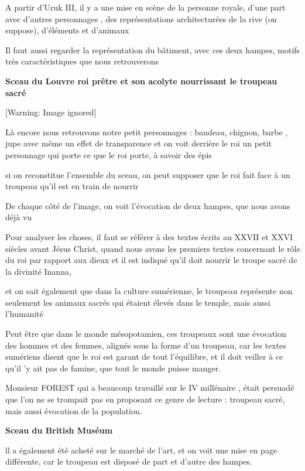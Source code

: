 \documentclass[a4paper,10pt]{article}
\begin{document}
A partir d'Uruk III, il y a une mise en scène de la
personne royale, d'une part avec
d'autres personnages , des représentations
architecturées de la rive (on suppose), d'éléments et
d'animaux

Il faut aussi regarder la représentation du bâtiment, avec ces deux
hampes, motifs très caractéristiques que nous retrouverons

\textbf{Sceau du Louvre  roi prêtre et son acolyte nourrissant le
troupeau sacré}

  [Warning: Image ignored] %
 

Là encore nous retrouvons notre petit personnages  : bandeau, chignon,
barbe , jupe avec même un effet de transparence et on voit derrière le
roi un petit personnage qui porte ce que le roi porte, à savoir des
épis

si on reconstitue l'ensemble du sceau,  on peut
supposer que le roi fait face à un troupeau qu'il est
en train de nourrir

De chaque côté de l'image, on voit
l'évocation de deux hampes, que nous avons déjà vu

Pour analyser les choses, il faut se référer à des textes écrits au
XXVII et XXVI siècles avant Jésus Christ, quand nous avons les premiers
textes concernant le rôle du roi par rapport aux dieux et il est
indiqué qu'il doit nourrir le troupe sacré de la
divinité Inanna, 

et on sait également que dans la culture sumérienne, le troupeau
représente non seulement les animaux sacrés qui étaient élevés dans le
temple, mais aussi l'humanité

Peut être que dans le monde mésopotamien, ces troupeaux sont une
évocation des hommes et des femmes, alignés sous la forme
d'un troupeau, car les textes sumériens disent que le
roi est garant de tout l'équilibre, et il doit veiller
à ce qu'il 'y ait pas de famine, que
tout le monde puisse manger.

Monsieur FOREST qui a beaucoup travaillé sur le IV millénaire , était
persuadé que l'on ne se trompait pas en proposant ce
genre de lecture : troupeau sacré, mais aussi évocation de la
population.

\textbf{Sceau du British Muséum}

ll a également été acheté sur le marché de l'art, et on
voit une mise en page différente, car le troupeau est disposé de part
et d'autre des hampes.
\end{document}
